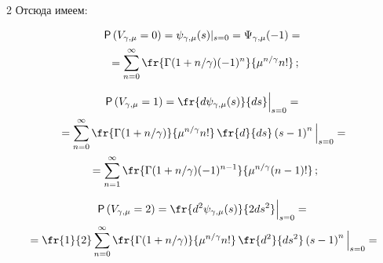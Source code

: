 \begin{multicols}{2}
Отсюда имеем:


\begin{multline*}


{\sf P}\left(V_{\gamma,\mu}=0\right)=


\psi_{\gamma,\mu}(s)|_{s=0}=\Psi_{\gamma,\mu}(-1)={}\\[1pt]


{}=


\sum\limits_{n=0}^{\infty}\fr{\Gamma(1+{n}/{\gamma})(-1)^n}{\mu^{n/\gamma}n!}\,;


\end{multline*}





\vspace*{-12pt}





\begin{multline*}


{\sf P}\left(V_{\gamma,\mu}=1\right)=


\fr{d\psi_{\gamma,\mu}(s)}{ds}\Big|_{s=0}={}\\[1pt]


{}=


\sum\limits_{n=0}^{\infty}\fr{\Gamma(1+{n}/{\gamma})}{\mu^{n/\gamma}n!}\,


\fr{d}{ds}\left(s-1\right)^n\Big|_{s=0}={}\\[1pt]


{}=


\sum\limits_{n=1}^{\infty}\fr{\Gamma(1+{n}/{\gamma})(-1)^{n-1}}{\mu^{n/\gamma}(n-1)!}\,;


\end{multline*}





\vspace*{-12pt}





\begin{multline*}


{\sf P}\left(V_{\gamma,\mu}=2\right)=


\fr{d^2\psi_{\gamma,\mu}(s)}{2ds^2}\Big|_{s=0}={}\\[1pt]


{}=


\fr{1}{2}\sum\limits_{n=0}^{\infty}\fr{\Gamma(1+{n}/{\gamma})}


{\mu^{n/\gamma}n!}\,\fr{d^2}{ds^2}\left(s-1\right)^n\Big|_{s=0}={}\\[1pt]



\end{multline*}
\end{multicols}
